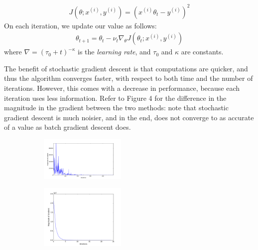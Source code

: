 \documentclass[10pt]{paper}
\begin{document}
\begin{align*}
J(\theta; x^{(i)}, y^{(i)}) = (x^{(i)}\theta_t - y^{(i)})^2
\end{align*}
On each iteration, we update our value as follows:
\begin{align*}
\theta_{t+1} = \theta_{t} - \nu_t \nabla_\theta J(\theta_t; x^{(i)}, y^{(i)})
\end{align*}
where $\nabla = (\tau_0 + t)^{-\kappa}$ is the \emph{learning rate}, and $\tau_0$ and $\kappa$ are constants.

The benefit of stochastic gradient descent is that computations are quicker, and thus the algorithm converges faster, with respect to both time and the number of iterations. However, this comes with a decrease in performance, because each iteration uses less information. Refer to Figure 4 for the difference in the magnitude in the gradient between the two methods: note that stochastic gradient descent is much noisier, and in the end, does not converge to as accurate of a value as batch gradient descent does.

\begin{figure}[ht!]
  \center
  \begin{subfigure}
    \centering
      \includegraphics[width=0.45\textwidth]{../images/stochastic_gradient_steps}
  \end{subfigure}
  \begin{subfigure}
    \centering
      \includegraphics[width=0.45\textwidth]{../images/batch_gradient_steps}
  \end{subfigure}
\end{figure}
\end{document}
